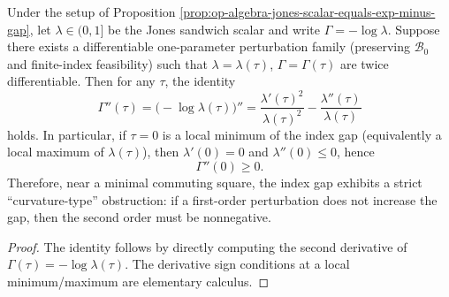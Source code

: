 \begin{corollary}\label{cor:op-algebra-index-gap-curvature-second-variation}
Under the setup of Proposition \ref{prop:op-algebra-jones-scalar-equals-exp-minus-gap}, let \(\lambda\in(0,1]\) be the Jones sandwich scalar and write \(\Gamma=-\log\lambda\).
Suppose there exists a differentiable one-parameter perturbation family (preserving \(\mathcal{B}_0\) and finite-index feasibility) such that \(\lambda=\lambda(\tau)\), \(\Gamma=\Gamma(\tau)\) are twice differentiable.
Then for any \(\tau\), the identity
\[
\boxed{\;
\Gamma''(\tau)=\bigl(-\log\lambda(\tau)\bigr)''=\frac{\lambda'(\tau)^2}{\lambda(\tau)^2}-\frac{\lambda''(\tau)}{\lambda(\tau)}\;}
\]
holds.
In particular, if \(\tau=0\) is a local minimum of the index gap (equivalently a local maximum of \(\lambda(\tau)\)), then \(\lambda'(0)=0\) and \(\lambda''(0)\le 0\), hence
\[
\boxed{\;\Gamma''(0)\ge 0.\;}
\]
Therefore, near a minimal commuting square, the index gap exhibits a strict ``curvature-type'' obstruction: if a first-order perturbation does not increase the gap, then the second order must be nonnegative.
\end{corollary}
\begin{proof}
The identity follows by directly computing the second derivative of \(\Gamma(\tau)=-\log\lambda(\tau)\).
The derivative sign conditions at a local minimum/maximum are elementary calculus. \qedhere
\end{proof}

